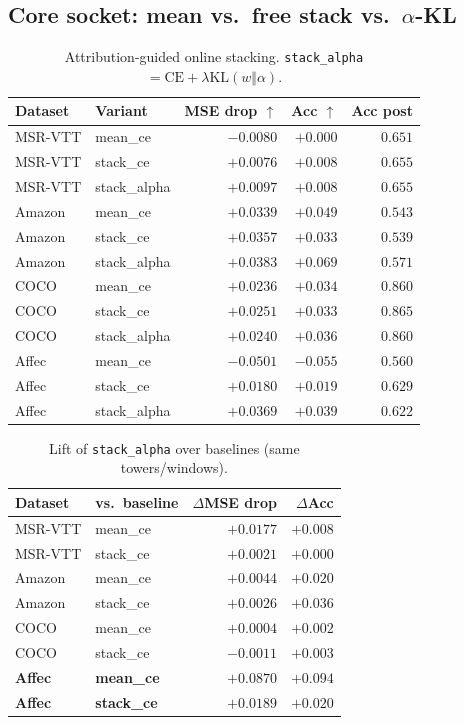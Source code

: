 \documentclass[11pt]{article}
\begin{document}
\subsection{Core socket: mean vs.\ free stack vs.\ $\alpha$-KL}
\begin{table}[t]
\centering
\caption{Attribution-guided online stacking.
\texttt{stack\_alpha} $= \mathrm{CE}+\lambda\mathrm{KL}(w\Vert\alpha)$.}
\label{tab:naive-core}
\begin{tabular}{llrrr}
\toprule
Dataset & Variant & MSE drop $\uparrow$ & Acc $\uparrow$ & Acc post \\
\midrule
MSR-VTT & mean\_ce     & $-0.0080$ & $+0.000$ & $0.651$ \\
MSR-VTT & stack\_ce    & $+0.0076$ & $+0.008$ & $0.655$ \\
MSR-VTT & stack\_alpha & $+0.0097$ & $+0.008$ & $0.655$ \\
\midrule
Amazon  & mean\_ce     & $+0.0339$ & $+0.049$ & $0.543$ \\
Amazon  & stack\_ce    & $+0.0357$ & $+0.033$ & $0.539$ \\
Amazon  & stack\_alpha & $+0.0383$ & $+0.069$ & $0.571$ \\
\midrule
COCO    & mean\_ce     & $+0.0236$ & $+0.034$ & $0.860$ \\
COCO    & stack\_ce    & $+0.0251$ & $+0.033$ & $0.865$ \\
COCO    & stack\_alpha & $+0.0240$ & $+0.036$ & $0.860$ \\
\midrule
Affec   & mean\_ce     & $-0.0501$ & $-0.055$ & $0.560$ \\
Affec   & stack\_ce    & $+0.0180$ & $+0.019$ & $0.629$ \\
Affec   & stack\_alpha & $+0.0369$ & $+0.039$ & $0.622$ \\
\bottomrule
\end{tabular}
\end{table}

\begin{table}[t]
\centering
\caption{Lift of \texttt{stack\_alpha} over baselines (same towers/windows).}
\label{tab:naive-core-lift}
\begin{tabular}{llrr}
\toprule
Dataset & vs.\ baseline & $\Delta$MSE drop & $\Delta$Acc \\
\midrule
MSR-VTT & mean\_ce  & $+0.0177$ & $+0.008$ \\
MSR-VTT & stack\_ce & $+0.0021$ & $+0.000$ \\
Amazon  & mean\_ce  & $+0.0044$ & $+0.020$ \\
Amazon  & stack\_ce & $+0.0026$ & $+0.036$ \\
COCO    & mean\_ce  & $+0.0004$ & $+0.002$ \\
COCO    & stack\_ce & $-0.0011$ & $+0.003$ \\
\textbf{Affec} & \textbf{mean\_ce}  & $\mathbf{+0.0870}$ & $\mathbf{+0.094}$ \\
\textbf{Affec} & \textbf{stack\_ce} & $\mathbf{+0.0189}$ & $\mathbf{+0.020}$ \\
\bottomrule
\end{tabular}
\end{table}
\end{document}
